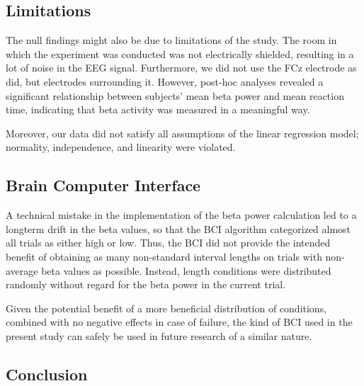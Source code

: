 \documentclass[man,floatsintext]{apa6} %
\begin{document}
\subsection{Limitations}
The null findings might also be due to limitations of the study. The
room in which the experiment was conducted was not electrically
shielded, resulting in a lot of noise in the EEG signal. Furthermore,
we did not use the FCz electrode as  did,
but electrodes surrounding it. However, post-hoc analyses revealed a
significant relationship between subjects' mean beta power and mean
reaction time, indicating that beta activity was measured in a meaningful
way.

Moreover, our data did not satisfy all assumptions of the linear
regression model; normality, independence, and linearity were
violated.

\subsection{Brain Computer Interface}
A technical mistake in the implementation of the beta power
calculation led to a longterm drift in the beta values, so that the
BCI algorithm categorized almost all trials as either high or
low. Thus, the BCI did not provide the intended benefit of obtaining
as many non-standard interval lengths on trials with non-average beta
values as possible. Instead, length conditions were distributed
randomly without regard for the beta power in the current trial.

Given the potential benefit of a more beneficial distribution of
conditions, combined with no negative effects in case of failure, the
kind of BCI used in the present study can safely be used in future
research of a similar nature.

\subsection{Conclusion}











\end{document}

